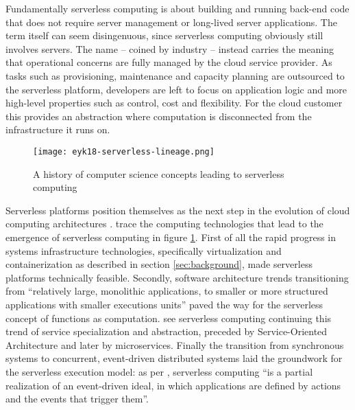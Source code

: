 Fundamentally serverless computing is about building and running back-end code that does not require server management or long-lived server applications. The term itself can seem disingenuous, since serverless computing obviously still involves servers. The name -- coined by industry -- instead carries the meaning that operational concerns are fully managed by the cloud service provider. As tasks such as provisioning, maintenance and capacity planning are outsourced to the serverless platform, developers are left to focus on application logic and more high-level properties such as control, cost and flexibility. For the cloud customer this provides an abstraction where computation is disconnected from the infrastructure it runs on. \parencite{robert2016serverlessarchitectures,cncf18serverlessWG}

\begin{figure}[h]
  \centering
  \texttt{[image: eyk18-serverless-lineage.png]}
  \caption{A history of computer science concepts leading to serverless computing \parencite{van18fromPAAStoPresent}}
  \label{fig:serverlessLineage}
\end{figure}

Serverless platforms position themselves as the next step in the evolution of cloud computing architectures \parencite{baldini17currentTrends}. \textcite{van18fromPAAStoPresent} trace the computing technologies that lead to the emergence of serverless computing in figure \ref{fig:serverlessLineage}. First of all the rapid progress in systems infrastructure technologies, specifically virtualization and containerization as described in section \ref{sec:background}, made serverless platforms technically feasible. Secondly, software architecture trends transitioning from ``relatively large, monolithic applications, to smaller or more structured applications with smaller executions units'' \parencite{van2017spec} paved the way for the serverless concept of functions as computation. \textcite{van18fromPAAStoPresent} see serverless computing continuing this trend of service specialization and abstraction, preceded by Service-Oriented Architecture and later by microservices. Finally the transition from synchronous systems to concurrent, event-driven distributed systems laid the groundwork for the serverless execution model: as per \textcite{mcgrath17implement}, serverless computing ``is a partial realization of an event-driven ideal, in which applications are defined by actions and the events that trigger them''.

